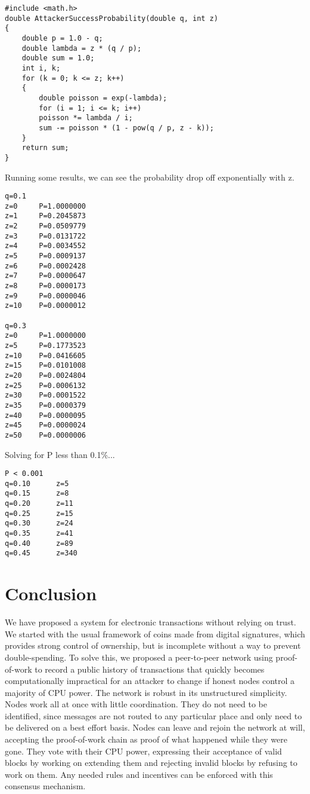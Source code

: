 \documentclass{article}
\begin{document}
\begin{verbatim}
#include <math.h>
double AttackerSuccessProbability(double q, int z)
{
    double p = 1.0 - q;
    double lambda = z * (q / p);
    double sum = 1.0;
    int i, k;
    for (k = 0; k <= z; k++)
    {
        double poisson = exp(-lambda);
        for (i = 1; i <= k; i++)
        poisson *= lambda / i;
        sum -= poisson * (1 - pow(q / p, z - k));
    }
    return sum;
}
\end{verbatim}

Running some results, we can see the probability drop off exponentially with z. \\

\begin{verbatim}
q=0.1
z=0     P=1.0000000
z=1     P=0.2045873
z=2     P=0.0509779
z=3     P=0.0131722
z=4     P=0.0034552
z=5     P=0.0009137
z=6     P=0.0002428
z=7     P=0.0000647
z=8     P=0.0000173
z=9     P=0.0000046
z=10    P=0.0000012

q=0.3
z=0     P=1.0000000
z=5     P=0.1773523
z=10    P=0.0416605
z=15    P=0.0101008
z=20    P=0.0024804
z=25    P=0.0006132
z=30    P=0.0001522
z=35    P=0.0000379
z=40    P=0.0000095
z=45    P=0.0000024
z=50    P=0.0000006
\end{verbatim}

Solving for P less than 0.1\%... \\

\begin{verbatim}
P < 0.001
q=0.10      z=5
q=0.15      z=8
q=0.20      z=11
q=0.25      z=15
q=0.30      z=24
q=0.35      z=41
q=0.40      z=89
q=0.45      z=340
\end{verbatim}

\section{Conclusion}\label{sec:conclusion}

We have proposed a system for electronic transactions without relying on trust. We started with
the usual framework of coins made from digital signatures, which provides strong control of
ownership, but is incomplete without a way to prevent double-spending. To solve this, we
proposed a peer-to-peer network using proof-of-work to record a public history of transactions
that quickly becomes computationally impractical for an attacker to change if honest nodes
control a majority of CPU power. The network is robust in its unstructured simplicity. Nodes
work all at once with little coordination. They do not need to be identified, since messages are
not routed to any particular place and only need to be delivered on a best effort basis. Nodes can
leave and rejoin the network at will, accepting the proof-of-work chain as proof of what
happened while they were gone. They vote with their CPU power, expressing their acceptance of
valid blocks by working on extending them and rejecting invalid blocks by refusing to work on
them. Any needed rules and incentives can be enforced with this consensus mechanism.

\printbibliography
\end{document}
